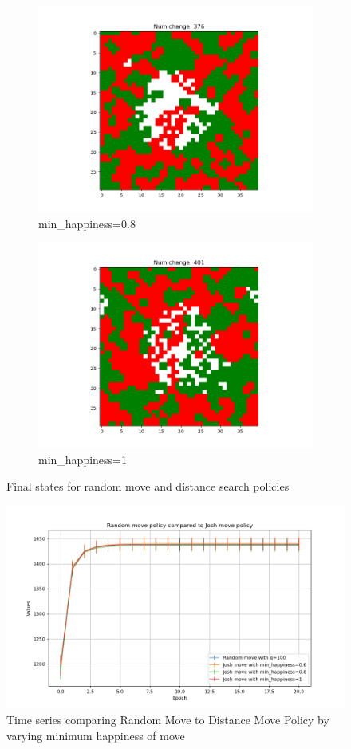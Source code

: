 \documentclass[11pt]{article}
\begin{document}
\begin{figure}[h]
\begin{subfigure}{0.14\textwidth}
			\includegraphics[width=\linewidth]{policy4_final_min8.png}
			\caption{\centering min_happiness=0.8}
			\label{distance_finalmin8}
		\end{subfigure}\hfill
		\begin{subfigure}{0.14\textwidth}
			\includegraphics[width=\linewidth]{policy4_final_min1.png}
			\caption{\centering min_happiness=1}
			\label{distance_finalmin1}
		\end{subfigure}\hfill
		\caption{Final states for random move and distance search policies}
		\label{distance_finalstate}
	\end{figure}
	\vspace{-2em} %
	\FloatBarrier
	\begin{figure}
		\centering
		\includegraphics[width=.5\textwidth]{policies04.png}
		\caption{Time series comparing Random Move to Distance Move Policy by varying minimum happiness of move}
		\label{p4_ts}
	\end{figure}
\end{document}
